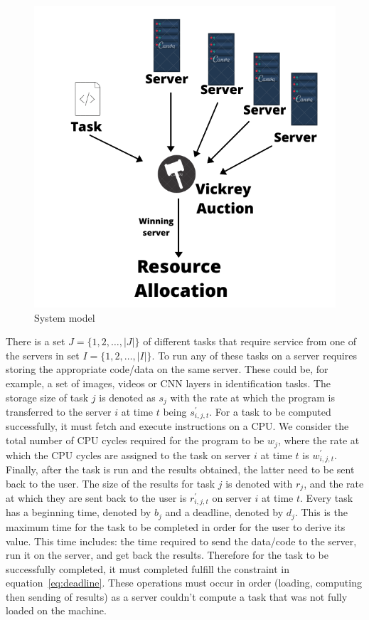 \begin{figure}
    \centering
    \includegraphics{extra/system_model.pdf}
    \caption{System model}
    \label{fig:system_model}
\end{figure}

There is a set $J = \{1,2,\ldots,\left| J \right|\}$ of  different tasks that require service from one of the servers
in set $I = \{1,2,\ldots, \left| I \right|\}$. To run any of these tasks on a server requires storing the appropriate
code/data on the same server. These could be, for example, a set of images, videos or CNN layers in identification
tasks. The storage size of task $j$ is denoted as $s_j$ with the rate at which the program is transferred to the server
$i$ at time $t$ being $s^{'}_{i,j,t}$. For a task to be computed successfully, it must fetch and execute instructions
on a CPU. We consider the total number of CPU cycles required for the program to be $w_j$, where the rate at which the
CPU cycles are assigned to the task on server $i$ at time $t$ is $w^{'}_{i,j,t}$. Finally, after the task is run and
the results obtained, the latter need to be sent back to the user. The size of the results for task $j$ is denoted with
$r_j$, and the rate at which they are sent back to the user is $r^{'}_{i,j,t}$ on server $i$ at time $t$. Every task
has a beginning time, denoted by $b_j$ and a deadline, denoted by $d_j$. This is the maximum time for the task to be
completed in order for the user to derive its value. This time includes: the time required to send the data/code to the
server, run it on the server, and get back the results. Therefore for the task to be successfully completed, it must
completed fulfill the constraint in equation~\eqref{eq:deadline}. These operations must occur in order (loading,
computing then sending of results) as a server couldn't compute a task that was not fully loaded on the machine.

